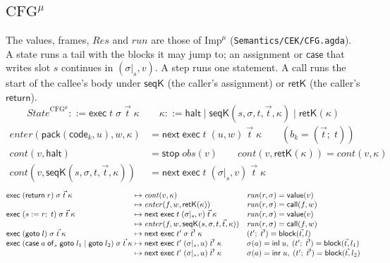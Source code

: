 \documentclass[10pt]{article}
\theoremstyle{acmplain}
\newcommand{\key}[1]{\mathsf{#1}}
\newcommand{\nxt}{\key{next}\;}
\newcommand{\stp}{\key{stop}\;}
\newcommand{\obs}{\mathit{obs}}
\newcommand{\codeV}[1]{\key{code}_{#1}}
\newcommand{\inlV}{\key{inl}\;}
\newcommand{\inrV}{\key{inr}\;}
\newcommand{\Kf}[2]{\key{#1}(#2)}
\newcommand{\halt}{\key{halt}}
\newcommand{\assign}[3]{#1 \mathrel{:=} #2;\; #3}
\newcommand{\exc}[4]{\key{exec}\;#1\;#2\;#3\;#4}
\newcommand{\Tpack}[2]{\key{pack}(#1, #2)}     %
\newcommand{\Treturn}[1]{\key{return}\;#1}
\newcommand{\Tgoto}[1]{\key{goto}\;#1}
\newcommand{\Tcase}[4]{\key{case}\;#1\;\key{of}_{#2}\;\key{goto}\;#3 \mid \key{goto}\;#4}
\newcommand{\Tcut}[2]{#1|_{#2}}                %
\newcommand{\Ml}[1]{\textrm{#1}^{\mu}}                  %
\begin{document}
\subsection{\texorpdfstring{$\Ml{CFG}$}{CFG-mu}}

The values, frames, $\mathit{Res}$ and $\mathit{run}$ are those of
$\Ml{Imp}$ (\texttt{Semantics/CEK/CFG.agda}). A state runs a tail with the
blocks it may jump to; an assignment or $\key{case}$ that writes slot $s$
continues in $(\Tcut{\sigma}{s}, v)$. A step runs one statement. A call
runs the start of the callee's body under $\key{seqK}$ (the caller's
assignment) or $\key{retK}$ (the caller's $\key{return}$).
\[
  \mathit{State}^{\Ml{CFG}} ::= \exc{t}{\sigma}{\vec{t}}{\kappa} \qquad
  \kappa ::= \halt \mid \Kf{seqK}{s, \sigma, t, \vec{t}, \kappa} \mid \Kf{retK}{\kappa}
\]
\begin{align*}
  \mathit{enter}(\Tpack{\codeV{k}}{u}, w, \kappa) &= \nxt \exc{t}{(u, w)}{\vec{t}}{\kappa}
    \qquad (b_k = (\vec{t};\; t)) \\
  \mathit{cont}(v, \halt) &= \stp \obs(v) \qquad
  \mathit{cont}(v, \Kf{retK}{\kappa}) = \mathit{cont}(v, \kappa) \\
  \mathit{cont}(v, \Kf{seqK}{s, \sigma, t, \vec{t}, \kappa}) &= \nxt \exc{t}{(\Tcut{\sigma}{s}, v)}{\vec{t}}{\kappa}
\end{align*}
\[
\begin{array}{@{}l@{\;\mapsto\;}l@{\quad}l@{}}
  \exc{(\Treturn{r})}{\sigma}{\vec{t}}{\kappa} & \mathit{cont}(v, \kappa) & \mathit{run}(r, \sigma) = \key{value}(v) \\
  & \mathit{enter}(f, w, \Kf{retK}{\kappa}) & \mathit{run}(r, \sigma) = \key{call}(f, w) \\
  \exc{(\assign{s}{r}{t})}{\sigma}{\vec{t}}{\kappa} &
    \nxt \exc{t}{(\Tcut{\sigma}{s}, v)}{\vec{t}}{\kappa} & \mathit{run}(r, \sigma) = \key{value}(v) \\
  & \mathit{enter}(f, w, \Kf{seqK}{s, \sigma, t, \vec{t}, \kappa}) & \mathit{run}(r, \sigma) = \key{call}(f, w) \\
  \exc{(\Tgoto{l})}{\sigma}{\vec{t}}{\kappa} & \nxt \exc{t'}{\sigma}{\vec{t}'}{\kappa} & (t';\; \vec{t}') = \key{block}(\vec{t}, l) \\
  \exc{(\Tcase{a}{s}{l_1}{l_2})}{\sigma}{\vec{t}}{\kappa} &
    \nxt \exc{t'}{(\Tcut{\sigma}{s}, u)}{\vec{t}'}{\kappa} & \sigma(a) = \inlV u,\; (t';\; \vec{t}') = \key{block}(\vec{t}, l_1) \\
  & \nxt \exc{t'}{(\Tcut{\sigma}{s}, u)}{\vec{t}'}{\kappa} & \sigma(a) = \inrV u,\; (t';\; \vec{t}') = \key{block}(\vec{t}, l_2)
\end{array}
\]
\end{document}
